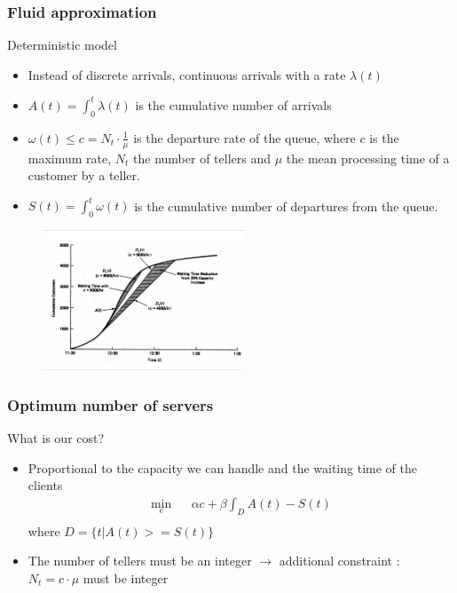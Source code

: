 \documentclass[10pt]{beamer}
\begin{document}
\begin{frame}
\frametitle{Fluid approximation}
\begin{block}{Deterministic model}
\begin{itemize}
\item Instead of discrete arrivals, continuous arrivals with a rate $\lambda(t)$
\item $A(t) = \int_0^t \lambda(t)$ is the cumulative number of arrivals
\item $\omega (t) \leq c = N_t \cdot \frac{1}{\mu}$ is the departure rate of the queue, where $c$ is the maximum rate, $N_t$ the number of tellers and $\mu$ the mean processing time of a customer by a teller.
\item $S(t) = \int_0^t \omega(t)$ is the cumulative number of departures from the queue.
\end{itemize}
\end{block}
\begin{figure}
\centering
\includegraphics[width = 6cm]{fluid_approx.png}
\end{figure}
\end{frame}

\begin{frame}
\frametitle{Optimum number of servers}
\begin{block}{What is our cost?}
\begin{itemize}
\item Proportional to the capacity we can handle and the waiting time of the clients
\begin{eqnarray*}
\min_c & & \alpha c + \beta \int_D A(t)-S(t)\\
\end{eqnarray*}
where $D = \{t | A(t)>=S(t) \}$
\item The number of tellers must be an integer $\rightarrow$ additional constraint : $N_t = c \cdot \mu$ must be integer
\end{itemize}
\end{block}
\begin{figure}
\centering

\end{figure}
\end{frame}
\end{document}
